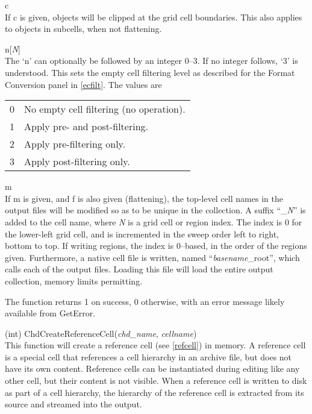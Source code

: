 \begin{description}
\begin{description}
\begin{description}
\item{\vt c}\\
If {\vt c} is given, objects will be clipped at the grid cell
boundaries.  This also applies to objects in subcells, when not
flattening.

\item{\vt n}[{\it N\/}]\\
The `{\vt n}' can optionally be followed by an integer 0--3.  If no
integer follows, `3' is understood.  This sets the empty cell
filtering level as described for the {\cb Format Conversion} panel in
\ref{ecfilt}.  The values are

\begin{tabular}{ll}
0 & No empty cell filtering (no operation).\\
1 & Apply pre- and post-filtering.\\
2 & Apply pre-filtering only.\\
3 & Apply post-filtering only.\\
\end{tabular}

\item{\vt m}\\
If {\vt m} is given, and {\vt f} is also given (flattening), the
top-level cell names in the output files will be modified so as to be
unique in the collection.  A suffix ``\_{\it N\/}'' is added to the
cell name, where {\it N} is a grid cell or region index.  The index is
0 for the lower-left grid cell, and is incremented in the sweep order
left to right, bottom to top.  If writing regions, the index is
0--based, in the order of the regions given.  Furthermore, a native
cell file is written, named ``{\it basename\/}\_root'', which calls
each of the output files.  Loading this file will load the entire
output collection, memory limits permitting.
\end{description}
\end{description}

The function returns 1 on success, 0 otherwise, with an error message
likely available from {\vt GetError}.


\item{(int) \vt ChdCreateReferenceCell({\it chd\_name\/}, {\it cellname\/})}\\
This function will create a reference cell (see \ref{refcell}) in
memory.  A reference cell is a special cell that references a cell
hierarchy in an archive file, but does not have its own content. 
Reference cells can be instantiated during editing like any other
cell, but their content is not visible.  When a reference cell is
written to disk as part of a cell hierarchy, the hierarchy of the
reference cell is extracted from its source and streamed into the
output.


\end{description}
